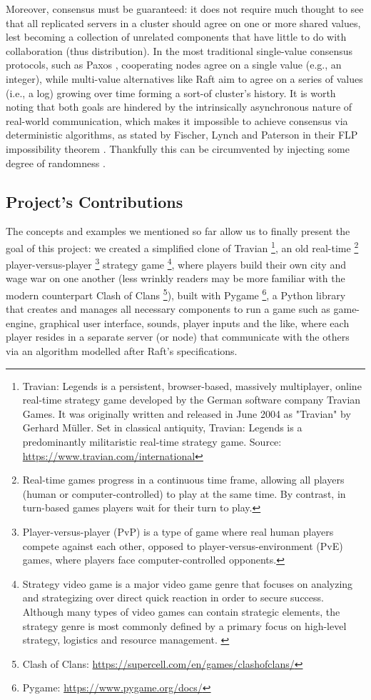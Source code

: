 Moreover, {consensus} must be guaranteed: it does not require much thought to see that all {replicated} servers in a cluster should agree on one or more shared values, lest becoming a collection of unrelated components that have little to do with collaboration (thus distribution). In the most traditional single-value consensus protocols, such as Paxos \cite{paxos}, cooperating nodes agree on a single value (e.g., an integer), while multi-value alternatives like Raft \cite{raft} aim to agree on a series of values (i.e., a log) growing over time forming a sort-of cluster's history. It is worth noting that both goals are hindered by the intrinsically asynchronous nature of real-world communication, which makes it impossible to achieve consensus via deterministic algorithms, as stated by Fischer, Lynch and Paterson in their FLP impossibility theorem \cite{flp}. Thankfully this can be circumvented by injecting some {degree of randomness \cite{randomizedConsesus}}.

\subsection{Project's Contributions}

The concepts and examples we mentioned so far allow us to finally present the goal of this project: we {created} a simplified clone of Travian \footnote{Travian: Legends is a persistent, browser-based, massively multiplayer, online real-time strategy game developed by the German software company Travian Games. It was originally written and released in June 2004 as "Travian" by Gerhard Müller. Set in classical antiquity, Travian: Legends is a predominantly militaristic real-time strategy game. Source: \url{https://www.travian.com/international}}, an old real-time \footnote{Real-time games progress in a continuous time frame, allowing all players (human or computer-controlled) to play at the same time. By contrast, in turn-based games players wait for their turn to play.} player-versus-player \footnote{Player-versus-player (PvP) is a type of game where real human players compete against each other, opposed to player-versus-environment (PvE) games, where players face computer-controlled opponents.} strategy game \footnote{Strategy video game is a major video game genre that focuses on analyzing and strategizing over direct quick reaction in order to secure success. Although many types of video games can contain strategic elements, the strategy genre is most commonly defined by a primary focus on high-level strategy, logistics and resource management. \cite{rollings2003andrew}}, where players build their own city and wage war on one another (less wrinkly readers may be more familiar with the modern counterpart Clash of Clans \footnote{Clash of Clans: \url{https://supercell.com/en/games/clashofclans/}}), built with Pygame \footnote{Pygame: \url{https://www.pygame.org/docs/}}, a Python library that creates and manages all necessary components to run a game such as game-engine, graphical user interface, sounds, player inputs and the like, where each player resides in a separate server (or node) that communicate with the others via an algorithm modelled after Raft's specifications. 

